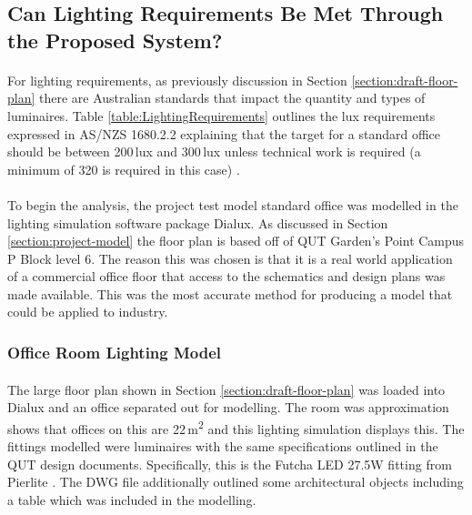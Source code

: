 \subsection{Can Lighting Requirements Be Met Through the Proposed System?}

\paragraph{}
For lighting requirements, as previously discussion in Section \ref{section:draft-floor-plan} there are Australian standards that impact the quantity and types of luminaires. Table \ref{table:LightingRequirements} outlines the lux requirements expressed in AS/NZS 1680.2.2 explaining that the target for a standard office should be between 200\,lux and 300\,lux unless technical work is required (a minimum of 320 is required in this case) \cite{StandardsAustralia2006_2}.

\paragraph{}
To begin the analysis, the project test model standard office was modelled in the lighting simulation software package Dialux. As discussed in Section \ref{section:project-model} the floor plan is based off of QUT Garden's Point Campus P Block level 6. The reason this was chosen is that it is a real world application of a commercial office floor that access to the schematics and design plans was made available. This was the most accurate method for producing a model that could be applied to industry. 

\subsubsection{Office Room Lighting Model}   

\paragraph{}
The large floor plan shown in Section \ref{section:draft-floor-plan} was loaded into Dialux and an office separated out for modelling. The room was approximation shows that offices on this are 22\,\si{m^2} and this lighting simulation displays this. The fittings modelled were luminaires with the same specifications outlined in the QUT design documents. Specifically, this is the Futcha LED 27.5W fitting from Pierlite \cite{website:Pierlite1}. The DWG file additionally outlined some architectural objects including a table which was included in the modelling. 

